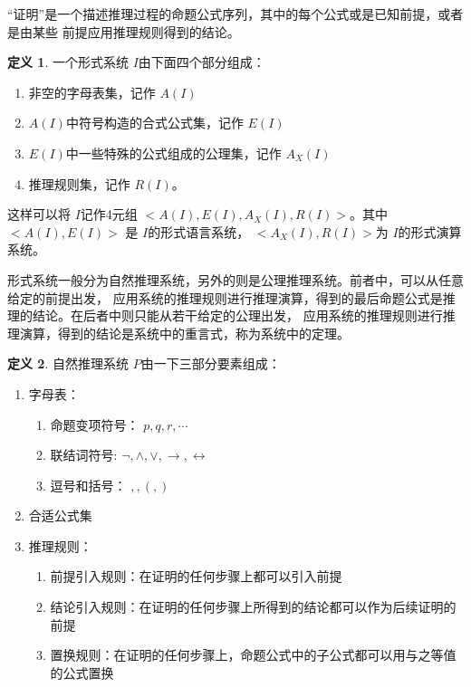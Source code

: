 \documentclass[a4paper,11pt]{article}%
\theoremstyle{remark}
\theoremstyle{remark}
\theoremstyle{definition}
\theoremstyle{definition}
\newtheorem*{definition}{定义}
\theoremstyle{plain}
\begin{document}
“证明”是一个描述推理过程的命题公式序列，其中的每个公式或是已知前提，或者是由某些
前提应用推理规则得到的结论。
\begin{definition}
    一个形式系统 $I$由下面四个部分组成：
    \begin{enumerate}
        \item 非空的字母表集，记作 $A(I)$
        \item  $A(I)$中符号构造的合式公式集，记作 $E(I)$
        \item $E(I)$中一些特殊的公式组成的公理集，记作 $A_X(I)$
        \item 推理规则集，记作 $R(I)$。
    \end{enumerate}
    这样可以将 $I$记作4元组 $<A(I),E(I),A_X(I),R(I)>$。其中 $<A(I),E(I)>$
    是 $I$的形式语言系统， $<A_X(I),R(I)>$为 $I$的形式演算系统。
\end{definition}

形式系统一般分为自然推理系统，另外的则是公理推理系统。前者中，可以从任意给定的前提出发，
应用系统的推理规则进行推理演算，得到的最后命题公式是推理的结论。在后者中则只能从若干给定的公理出发，
应用系统的推理规则进行推理演算，得到的结论是系统中的重言式，称为系统中的定理。

\begin{definition}
    自然推理系统 $P$由一下三部分要素组成：
    \begin{enumerate}
        \item 字母表：
        \begin{enumerate}
            \item 命题变项符号： $p,q,r,\cdots$
            \item 联结词符号: $\lnot,\land,\lor,\rightarrow,\leftrightarrow$
            \item 逗号和括号： $,,(,)$
        \end{enumerate}
        \item 合适公式集
        \item 推理规则：
        \begin{enumerate}
            \item 前提引入规则：在证明的任何步骤上都可以引入前提
            \item 结论引入规则：在证明的任何步骤上所得到的结论都可以作为后续证明的前提
            \item 置换规则：在证明的任何步骤上，命题公式中的子公式都可以用与之等值的公式置换
        \end{enumerate}
    \end{enumerate}
\end{definition}
\end{document}
